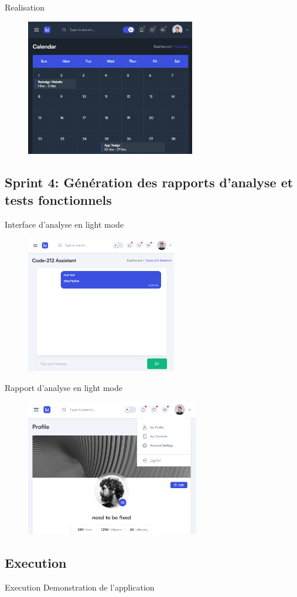 \begin{frame}{Realisation}
    \begin{figure}[H]
        \centering
        \includegraphics[height=6cm]{assets/images/calendar.png}
    \end{figure}
\end{frame}


\subsection{Sprint 4: Génération des rapports d'analyse et tests fonctionnels}

\begin{frame}{Interface d'analyse en light mode}
    \begin{figure}[H]
        \centering
        \includegraphics[height=6cm]{assets/images/light-chat.png}
    \end{figure}
\end{frame}

\begin{frame}{Rapport d'analyse en light mode}
    \begin{figure}[H]
        \centering
        \includegraphics[height=6cm]{assets/images/light-profile.png}
    \end{figure}
\end{frame}

\subsection{Execution}
\begin{frame}{Execution}
    Demonstration de l'application
\end{frame}
